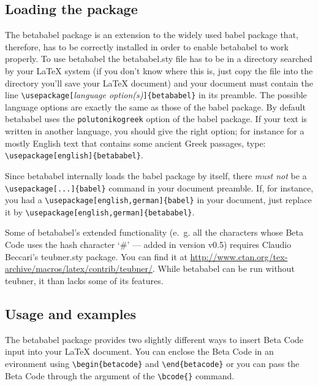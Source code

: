 \documentclass{article}
\begin{document}
\subsection{Loading the package}
The \textsf{betababel} package is an extension to the widely used \textsf{babel} package that, therefore, has to be correctly installed in order to enable {\sf betababel} to work properly. To use \textsf{betababel} the \textsf{betababel.sty} file has to be in a directory searched by your \LaTeX{} system (if you don't know where this is, just copy the file into the directory you'll save your \LaTeX{} document) and your document must contain the line \verb'\usepackage['\textit{language option(s)}\verb']{betababel}' in its preamble. The possible language options are exactly the same as those of the \textsf{babel} package. By default \textsf{betababel} uses the \texttt{polutonikogreek} option of the \textsf{babel} package. If your text is written in another language, you should give the right option; for instance for a mostly English text that contains some ancient Greek passages, type: \verb'\usepackage[english]{betababel}'.

Since \textsf{betababel} internally loads the \textsf{babel} package by itself, there \emph{must not} be a \verb'\usepackage[...]{babel}' command in your document preamble. If, for instance, you had a \verb'\usepackage[english,german]{babel}' in your document, just replace it by \verb'\usepackage[english,german]{betababel}'.

Some of \textsf{betababel}'s extended functionality (\frenchspacing e.\ g. \nonfrenchspacing all the characters whose Beta Code uses the hash character `\#' --- added in version v0.5) requires Claudio Beccari's \textsf{teubner.sty} package. You can find it at \url{http://www.ctan.org/tex-archive/macros/latex/contrib/teubner/}. While \textsf{betababel} can be run without \textsf{teubner}, it than lacks some of its features.

\subsection{Usage and examples}
\label{usage}
The \textsf{betababel} package provides two slightly different ways to insert Beta Code input into your \LaTeX{} document. You can enclose the Beta Code in an evironment using \verb'\begin{betacode}' and \verb'\end{betacode}' or you can pass the Beta Code through the argument of the \verb'\bcode{}' command.
\end{document}
